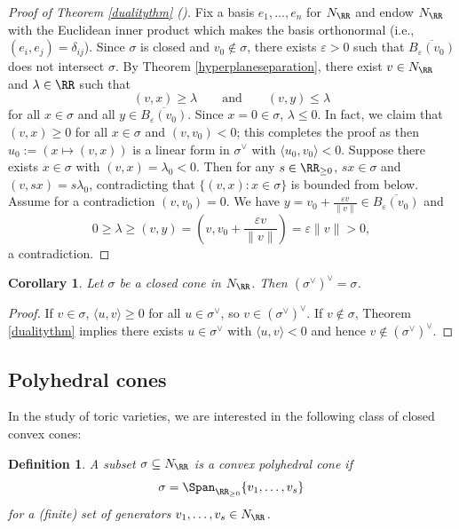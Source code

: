 \documentclass[12pt]{amsart}
\theoremstyle{plain}
\newtheorem{definition}[theorem]{Definition}
\newtheorem{corollary}[theorem]{Corollary}
\begin{document}
\begin{proof}[Proof of Theorem \ref{dualitythm} \textup{(\cite[Example 2.20]{BV04})}]
Fix a basis $e_1, \ldots, e_n$ for $N_\RR$ and endow $N_\RR$ with the Euclidean inner product which makes the basis orthonormal (i.e., $(e_i, e_j) = \delta_{ij}$).
Since $\sigma$ is closed and $v_0 \notin \sigma$, there exists $\varepsilon > 0$ such that $\overline{B_\varepsilon(v_0)}$ does not intersect $\sigma$.
By Theorem \ref{hyperplaneseparation}, there exist $v \in N_\RR$ and $\lambda \in \RR$ such that 
$$(v, x) \ge \lambda \qquad \text{and} \qquad (v, y) \le \lambda$$
for all $x \in \sigma$ and all $y \in \overline{B_\varepsilon(v_0)}$.
Since $x = 0 \in \sigma$, $\lambda \le 0$.
In fact, we claim that $(v, x) \ge 0$ for all $x \in \sigma$ and $(v, v_0) < 0$;
this completes the proof as then $u_0 := (x \mapsto (v, x))$ is a linear form in $\sigma^\vee$ with $\langle u_0, v_0 \rangle < 0$.
Suppose there exists $x \in \sigma$ with $(v, x) = \lambda_0 < 0$.
Then for any $s \in \RR_{\ge 0}$, $s x \in \sigma $ and $(v, s x) = s \lambda_0$, contradicting that $\{(v, x) : x \in \sigma\}$ is bounded from below.
Assume for a contradiction $(v, v_0) = 0$.
We have $y = v_0 + \frac{\varepsilon v}{\|v\|} \in \overline{B_\varepsilon(v_0)}$ and
$$0 \ge \lambda \ge (v, y) = (v, v_0 + \frac{\varepsilon v}{\|v\|}) = \varepsilon \|v\| > 0,$$
a contradiction.
\end{proof}

\begin{corollary}
Let $\sigma$ be a closed cone in $N_\RR$.
Then $(\sigma^\vee)^\vee = \sigma$.
\end{corollary}
\begin{proof}
If $v \in \sigma$, $\langle u, v\rangle \ge 0$ for all $u \in \sigma^\vee$, so $v \in (\sigma^\vee)^\vee$.
If $v \notin \sigma$, Theorem \ref{dualitythm} implies there exists $u \in \sigma^\vee$ with $\langle u, v \rangle < 0$ and hence $v \notin (\sigma^\vee)^\vee$.
\end{proof}

\subsection{Polyhedral cones} 
In the study of toric varieties, we are interested in the following class of closed convex cones:

\begin{definition}\label{convexpolyhedraldef}
A subset $\sigma \subseteq N_\RR$ is a \emph{convex polyhedral cone} if
$$\sigma = \Span_{\RR_{\ge 0}} \{v_1, \ldots, v_s\}$$
for a (finite) set of generators $v_1, \ldots, v_s \in N_\RR$.
\end{definition}
\end{document}
